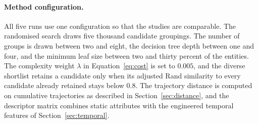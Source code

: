 \paragraph{Method configuration.} All five runs use one configuration so that the studies are comparable. The randomised search draws five thousand candidate groupings. The number of groups is drawn between two and eight, the decision tree depth between one and four, and the minimum leaf size between two and thirty percent of the entities. The complexity weight $\lambda$ in Equation~\ref{eq:cost} is set to $0.005$, and the diverse shortlist retains a candidate only when its adjusted Rand similarity to every candidate already retained stays below $0.8$. The trajectory distance is computed on cumulative trajectories as described in Section~\ref{sec:distance}, and the descriptor matrix combines static attributes with the engineered temporal features of Section~\ref{sec:temporal}.
